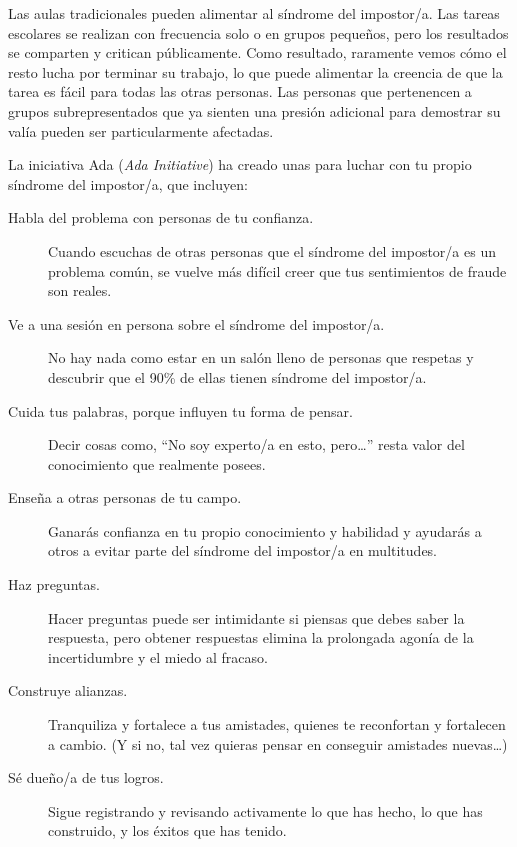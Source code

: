 Las aulas tradicionales pueden alimentar al síndrome del impostor/a.
Las tareas escolares se realizan con frecuencia solo o en grupos pequeños,
pero los resultados se comparten y critican públicamente.
Como resultado,
raramente vemos cómo el resto lucha por terminar su trabajo,
lo que puede alimentar la creencia de que la tarea es fácil para todas las otras personas.
Las personas que pertenencen a grupos subrepresentados que ya sienten una presión adicional para demostrar su valía
pueden ser particularmente afectadas.

La iniciativa Ada (\emph{Ada Initiative}) ha creado unas 
para luchar con tu propio síndrome del impostor/a,
que incluyen:

\begin{description}

\item[Habla del problema con personas de tu confianza.]
  Cuando escuchas de otras personas que el síndrome del impostor/a es un problema común,
  se vuelve más difícil creer que tus sentimientos de fraude son reales.

\item[Ve a una sesión en persona sobre el síndrome del impostor/a.]
  No hay nada como estar en un salón lleno de personas que respetas
  y descubrir que el 90\% de ellas tienen síndrome del impostor/a.

\item[Cuida tus palabras, porque influyen tu forma de pensar.]
  Decir cosas como,
  ``No soy experto/a en esto, pero{\dots}''
  resta valor del conocimiento que realmente posees.

\item[Enseña a otras personas de tu campo.]
  Ganarás confianza en tu propio conocimiento y habilidad
  y ayudarás a otros a evitar parte del síndrome del impostor/a en multitudes.

\item[Haz preguntas.]
    Hacer preguntas puede ser intimidante si piensas que debes saber la respuesta,
    pero obtener respuestas elimina la prolongada agonía de la incertidumbre y el miedo al fracaso.

\item[Construye alianzas.]
  Tranquiliza y fortalece a tus amistades,
  quienes te reconfortan y fortalecen a cambio.
  (Y si no, tal vez quieras pensar en conseguir amistades nuevas{\ldots})

\item[Sé dueño/a de tus logros.]
  Sigue registrando y revisando activamente lo que has hecho,
  lo que has construido,
  y los éxitos que has tenido.

\end{description}

